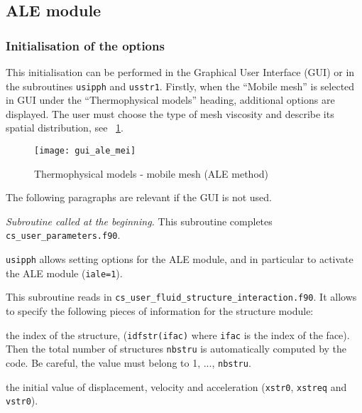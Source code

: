 {{{%
\subsection{ALE module}
\subsubsection{Initialisation of the options}
This initialisation can be performed in the Graphical User Interface (GUI)
 or in the subroutines \texttt{usipph} and \texttt{usstr1}. Firstly,
 when the ``Mobile mesh'' is selected in GUI under the ``Thermophysical models''
 heading, additional options are displayed. The user must choose the type of mesh
 viscosity and describe its spatial distribution, see \figurename~\ref{fig:Ini-ale}.

\begin{figure}[ht]
\begin{center}
\texttt{[image: gui\_ale\_mei]}
\caption{Thermophysical models - mobile mesh (ALE method)}
\label{fig:Ini-ale}
\end{center}
\end{figure}

The following paragraphs are relevant if the GUI is not used.

\noindent
\textit{Subroutine called at the beginning.}
This subroutine completes \texttt{cs\_user\_parameters.f90}.

\texttt{usipph} allows setting options for the ALE module, and in
particular to activate the ALE module (\texttt{iale=1}).


This subroutine reads in \texttt{cs\_user\_fluid\_structure\_interaction.f90}. It allows to specify the following pieces of information for the structure module:
\begin{list}{-}{}
  \item the index of the structure, (\texttt{idfstr(ifac)} where \texttt{ifac} is the index of the face). Then the total number of structures \texttt{nbstru} is automatically computed by the code. Be careful, the value must belong to 1, ..., \texttt{nbstru}.
  \item the initial value of displacement, velocity and acceleration
    (\texttt{xstr0}, \texttt{xstreq} and \texttt{vstr0}).
\end{list}

}}}
